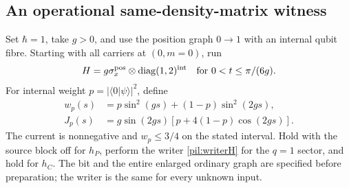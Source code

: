\documentclass[11pt,a4paper]{article}
\theoremstyle{definition}
\theoremstyle{remark}\newtheorem{remark}[theorem]{Remark}
\begin{document}
\subsection{An operational same-density-matrix witness}

Set $\hbar=1$, take $g>0$, and use the position graph $0\to1$ with an internal qubit fibre. Starting with all carriers at $(0,m=0)$, run
\begin{equation}\label{pil:productionH}
 H=g\sigma_x^{\rm pos}\otimes\operatorname{diag}(1,2)^{\rm int}
 \quad\hbox{for }0<t\le\pi/(6g).
\end{equation}
For internal weight $p=|\langle0|\psi\rangle|^2$, define
\begin{align}\label{pil:wJ}
 w_p(s)&=p\sin^2(gs)+(1-p)\sin^2(2gs),\\
 J_p(s)&=g\sin(2gs)[p+4(1-p)\cos(2gs)].\nonumber
\end{align}
The current is nonnegative and $w_p\le3/4$ on the stated interval. Hold with the source block off for $h_P$, perform the writer \eqref{pil:writerH} for the $q=1$ sector, and hold for $h_C$. The bit and the entire enlarged ordinary graph are specified before preparation; the writer is the same for every unknown input.
\end{document}
